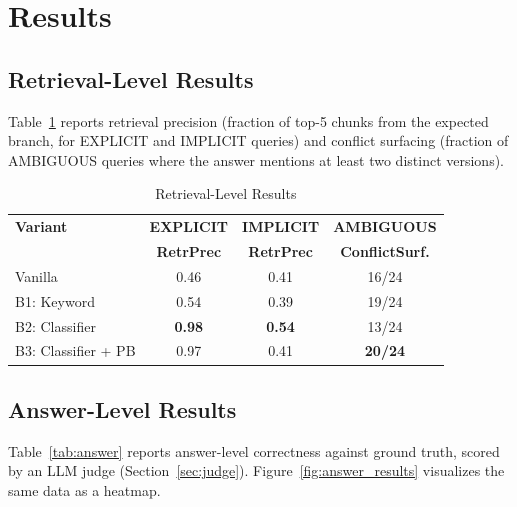 \documentclass[conference]{IEEEtran}
\begin{document}
\section{Results}

\subsection{Retrieval-Level Results}

Table~\ref{tab:main} reports retrieval precision (fraction of top-5 chunks from the expected branch, for EXPLICIT and IMPLICIT queries) and conflict surfacing (fraction of AMBIGUOUS queries where the answer mentions at least two distinct versions).

\begin{table}[htbp]
\caption{Retrieval-Level Results}
\begin{center}
\begin{tabular}{lccc}
\toprule
\textbf{Variant} & \textbf{EXPLICIT} & \textbf{IMPLICIT} & \textbf{AMBIGUOUS} \\
 & \textbf{RetrPrec} & \textbf{RetrPrec} & \textbf{ConflictSurf.} \\
\midrule
Vanilla & 0.46 & 0.41 & 16/24 \\
B1: Keyword & 0.54 & 0.39 & 19/24 \\
B2: Classifier & \textbf{0.98} & \textbf{0.54} & 13/24 \\
B3: Classifier + PB & 0.97 & 0.41 & \textbf{20/24} \\
\bottomrule
\end{tabular}
\label{tab:main}
\end{center}
\end{table}

\subsection{Answer-Level Results}
Table~\ref{tab:answer} reports answer-level correctness against ground truth, scored by an LLM judge (Section~\ref{sec:judge}). Figure~\ref{fig:answer_results} visualizes the same data as a heatmap.
\end{document}
